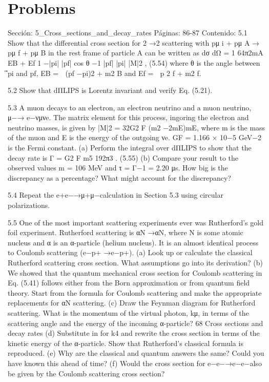 \section*{Problems}
Sección: 5_Cross_sections_and_decay_rates
Páginas: 86-87
Contenido:
5.1 Show that the differential cross section for 2 →2 scattering with pμ
i + pμ
A →
pμ
f + pμ
B in the rest frame of particle A can be written as
dσ
dΩ =
1
64π2mA
EB + Ef
1 −|⃗pi|
|⃗pf| cos θ
−1 |⃗pf|
|⃗pi| |M|2 ,
(5.54)
where θ is the angle between ⃗pi and ⃗pf, EB =

(⃗pf −⃗pi)2 + m2
B and Ef =

⃗p 2
f + m2
f.

5.2 Show that dΠLIPS is Lorentz invariant and verify Eq. (5.21).

5.3 A muon decays to an electron, an electron neutrino and a muon neutrino, μ−→
e−νμνe. The matrix element for this process, ingoring the electron and neutrino
masses, is given by |M|2 = 32G2
F (m2 −2mE)mE, where m is the mass of the
muon and E is the energy of the outgoing νe. GF = 1.166 × 10−5 GeV−2 is the
Fermi constant.
(a) Perform the integral over dΠLIPS to show that the decay rate is
Γ = G2
F m5
192π3 .
(5.55)
(b) Compare your result to the observed values m = 106 MeV and τ = Γ−1 =
2.20 μs. How big is the discrepancy as a percentage? What might account for
the discrepancy?

5.4 Repeat the e+e−→μ+μ−calculation in Section 5.3 using circular polarizations.

5.5 One of the most important scattering experiments ever was Rutherford’s gold foil
experiment. Rutherford scattering is αN →αN, where N is some atomic nucleus
and α is an α-particle (helium nucleus). It is an almost identical process to Coulomb
scattering (e−p+ →e−p+).
(a) Look up or calculate the classical Rutherford scattering cross section. What
assumptions go into its derivation?
(b) We showed that the quantum mechanical cross section for Coulomb scattering
in Eq. (5.41) follows either from the Born approximation or from quantum ﬁeld
theory. Start from the formula for Coulomb scattering and make the appropriate
replacements for αN scattering.
(c) Draw the Feynman diagram for Rutherford scattering. What is the momentum
of the virtual photon, kμ, in terms of the scattering angle and the energy of the
incoming α-particle?
68
Cross sections and decay rates
(d) Substitute in for k4 and rewrite the cross section in terms of the kinetic energy
of the α-particle. Show that Rutherford’s classical formula is reproduced.
(e) Why are the classical and quantum answers the same? Could you have known
this ahead of time?
(f) Would the cross section for e−e−→e−e−also be given by the Coulomb
scattering cross section?

